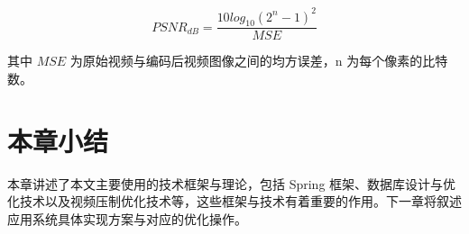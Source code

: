 \begin{equation}
\label{eq:forward_back_pre}
PSNR_{dB} = \frac{10log_{10}(2^{n} - 1)^{2}}{MSE}
\end{equation}

其中 $MSE$ 为原始视频与编码后视频图像之间的均方误差，n 为每个像素的比特数。

\section{本章小结}
本章讲述了本文主要使用的技术框架与理论，包括 Spring 框架、数据库设计与优化技术以及视频压制优化技术等，这些框架与技术有着重要的作用。下一章将叙述应用系统具体实现方案与对应的优化操作。







